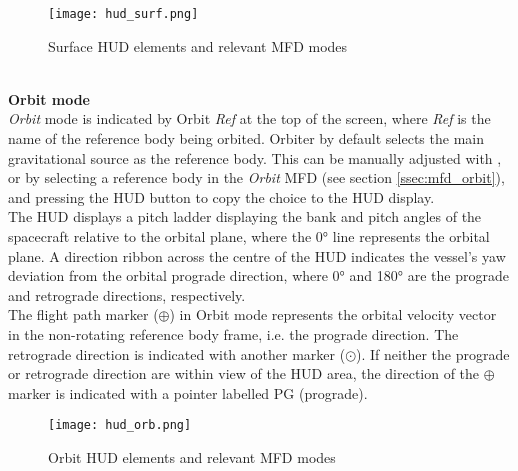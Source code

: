 \documentclass[Orbiter User Manual.tex]{subfiles}
\begin{document}
\begin{figure}[H]
  \centering
  \texttt{[image: hud\_surf.png]}
  \caption{Surface HUD elements and relevant MFD modes}
\end{figure}

\noindent
\\
\textbf{Orbit mode}\\
\textit{Orbit} mode is indicated by Orbit \textit{Ref} at the top of the screen, where \textit{Ref} is the name of the reference body being orbited. Orbiter by default selects the main gravitational source as the reference body. This can be manually adjusted with \Ctrl{}, or by selecting a reference body in the \textit{Orbit} MFD (see section \ref{ssec:mfd_orbit}), and pressing the HUD button to copy the choice to the HUD display.\\
The HUD displays a pitch ladder displaying the bank and pitch angles of the spacecraft relative to the orbital plane, where the 0° line represents the orbital plane. A direction ribbon across the centre of the HUD indicates the vessel's yaw deviation from the orbital prograde direction, where 0° and 180° are the prograde and retrograde directions, respectively.\\
The flight path marker ($\oplus$) in Orbit mode represents the orbital velocity vector in the non-rotating reference body frame, i.e. the prograde direction. The retrograde direction is indicated with another marker ($\odot$). If neither the prograde or retrograde direction are within view of the HUD area, the direction of the $\oplus$ marker is indicated with a pointer labelled PG (prograde).

\begin{figure}[H]
  \centering
  \texttt{[image: hud\_orb.png]}
  \caption{Orbit HUD elements and relevant MFD modes}
\end{figure}
\end{document}
